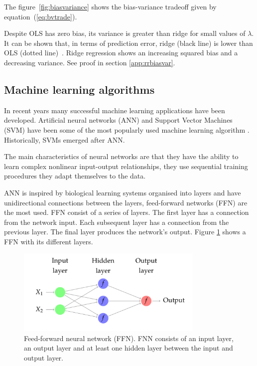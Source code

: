 The figure~\ref{fig:biasvariance} shows the bias-variance tradeoff
given by equation~(\ref{eq:bvtrade}). 

Despite OLS has zero bias,
its variance is greater than ridge for small values of $\lambda$.
It can be shown that, in terms of prediction error, ridge (black line)
is lower than OLS (dotted line)~\cite{hoerl1970}. Ridge regression shows an
increasing squared bias and a decreasing variance. See proof in section \ref{app:rrbiasvar}.



\subsection{Machine learning algorithms}
In recent years many successful machine learning applications have been developed. Artificial neural networks (ANN) and Support Vector Machines (SVM) have been some of the most popularly used machine learning algorithm \cite{haykin1998}. Historically, SVMs emerged after ANN.

The main characteristics of neural networks are that they have the ability to learn
complex nonlinear input-output relationships, they use sequential training procedures 
they adapt themselves to the data.

ANN is inspired by biological learning systems organised into layers and have unidirectional connections between the layers, feed-forward networks  (FFN) are the most used.  FFN consist of a series of layers. The first layer has a connection from the network input. Each subsequent layer has a connection from the previous layer. The final layer produces the network's output. Figure \ref{fig:ffn} shows a FFN with its different layers.

\begin{figure}[!h]
  \centering
  \includegraphics[width=0.8\textwidth]{img/ffn}
  \caption[Feed-forward neural network (FFN)]{Feed-forward neural network (FFN). FNN consists of an input layer, an output layer and at least one hidden layer between the input and output layer. }
  \label{fig:ffn}
\end{figure}


